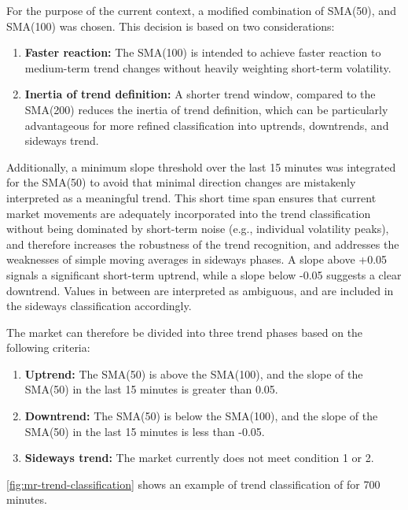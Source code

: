 For the purpose of the current context, a modified combination of SMA(50), and SMA(100) was chosen.
This decision is based on two considerations:

\begin{enumerate}
    \item \textbf{Faster reaction:} The SMA(100) is intended to achieve faster reaction to medium-term trend changes without heavily weighting short-term volatility.
    \item \textbf{Inertia of trend definition:} A shorter trend window, compared to the SMA(200) reduces the inertia of trend definition, which can be particularly advantageous for more refined classification into uptrends, downtrends, and sideways trend.
\end{enumerate}

\noindent
Additionally, a minimum slope threshold over the last 15 minutes was integrated for the SMA(50) to avoid that minimal direction changes are mistakenly interpreted as a meaningful trend.
This short time span ensures that current market movements are adequately incorporated into the trend classification without being dominated by short-term noise (e.g., individual volatility peaks), and therefore increases the robustness of the trend recognition, and addresses the weaknesses of simple moving averages in sideways phases.
A slope above +0.05 signals a significant short-term uptrend, while a slope below -0.05 suggests a clear downtrend.
Values in between are interpreted as ambiguous, and are included in the sideways classification accordingly.

The market can therefore be divided into three trend phases based on the following criteria:

\begin{enumerate}
    \item \textbf{Uptrend:} The SMA(50) is above the SMA(100), and the slope of the SMA(50) in the last 15 minutes is greater than 0.05.
    \item \textbf{Downtrend:} The SMA(50) is below the SMA(100), and the slope of the SMA(50) in the last 15 minutes is less than -0.05.
    \item \textbf{Sideways trend:} The market currently does not meet condition 1 or 2.
\end{enumerate}

\noindent
\autoref{fig:mr-trend-classification} shows an example of trend classification of \ethusdc for 700 minutes.

